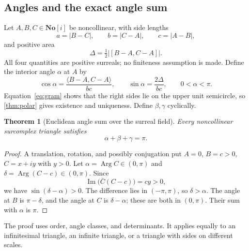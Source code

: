 \documentclass[11pt]{article}
\numberwithin{equation}{section}
\newtheorem{theorem}{Theorem}[section]
\theoremstyle{definition}
\newcommand{\SC}{\mathbf{No}[i]}
\newcommand{\im}{\operatorname{Im}}
\newcommand{\Arg}{\operatorname{Arg}}
\begin{document}
\subsection{Angles and the exact angle sum}
Let $A,B,C\in\SC$ be noncollinear, with side lengths
\[
 a=|B-C|,\qquad b=|C-A|,\qquad c=|A-B|,
\]
and positive area
\[
 \Delta=\tfrac12|[B-A,C-A]|.
\]
All four quantities are positive surreals; no finiteness assumption is made. Define the interior angle $\alpha$ at $A$ by
\begin{equation}\label{eq:interiorangle}
 \cos\alpha=\frac{\langle B-A,C-A\rangle}{bc},\qquad
 \sin\alpha=\frac{2\Delta}{bc},\qquad 0<\alpha<\pi.
\end{equation}
Equation~\eqref{eq:gram} shows that the right sides lie on the upper unit semicircle, so \cref{thm:polar} gives existence and uniqueness. Define $\beta,\gamma$ cyclically.

\begin{theorem}[Euclidean angle sum over the surreal field]\label{thm:anglesum}
Every noncollinear surcomplex triangle satisfies
\[
 \alpha+\beta+\gamma=\pi.
\]
\end{theorem}
\begin{proof}
A translation, rotation, and possibly conjugation put $A=0$, $B=c>0$, $C=x+iy$ with $y>0$. Let $\alpha=\Arg C\in(0,\pi)$ and $\delta=\Arg(C-c)\in(0,\pi)$. Since
\[
 \im\bigl(\bar C(C-c)\bigr)=cy>0,
\]
we have $\sin(\delta-\alpha)>0$. The difference lies in $(-\pi,\pi)$, so $\delta>\alpha$. The angle at $B$ is $\pi-\delta$, and the angle at $C$ is $\delta-\alpha$; these are both in $(0,\pi)$. Their sum with $\alpha$ is $\pi$.
\end{proof}
The proof uses order, angle classes, and determinants. It applies equally to an infinitesimal triangle, an infinite triangle, or a triangle with sides on different scales.
\end{document}
